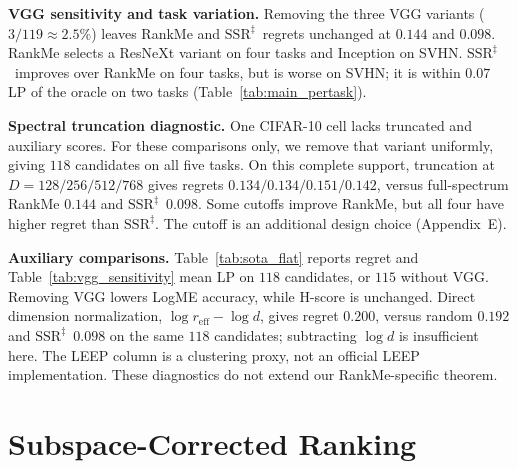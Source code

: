 \documentclass{article}
\newcommand{\reff}{\ensuremath{r_{\mathrm{eff}}}\xspace}
\newcommand{\SSRdag}{\ensuremath{\mathrm{SSR}^{\ddagger}}\xspace}
\begin{document}
\textbf{VGG sensitivity and task variation.} Removing the three VGG variants ($3/119\approx2.5\%$) leaves RankMe and \SSRdag\ regrets unchanged at $0.144$ and $0.098$. RankMe selects a ResNeXt variant on four tasks and Inception on SVHN. \SSRdag\ improves over RankMe on four tasks, but is worse on SVHN; it is within $0.07$ LP of the oracle on two tasks (Table~\ref{tab:main_pertask}).



\textbf{Spectral truncation diagnostic.} One CIFAR-10 cell lacks truncated and auxiliary scores. For these comparisons only, we remove that variant uniformly, giving $118$ candidates on all five tasks. On this complete support, truncation at $D=128/256/512/768$ gives regrets $0.134/0.134/0.151/0.142$, versus full-spectrum RankMe $0.144$ and \SSRdag\ $0.098$. Some cutoffs improve RankMe, but all four have higher regret than \SSRdag. The cutoff is an additional design choice (Appendix~E).

\textbf{Auxiliary comparisons.} Table~\ref{tab:sota_flat} reports regret and Table~\ref{tab:vgg_sensitivity} mean LP on $118$ candidates, or $115$ without VGG. Removing VGG lowers LogME accuracy, while H-score is unchanged. Direct dimension normalization, $\log\reff-\log d$, gives regret $0.200$, versus random $0.192$ and \SSRdag\ $0.098$ on the same $118$ candidates; subtracting $\log d$ is insufficient here. The LEEP column is a clustering proxy, not an official LEEP implementation. These diagnostics do not extend our RankMe-specific theorem.





\section{Subspace-Corrected Ranking}
\label{sec:ssr}
\end{document}
